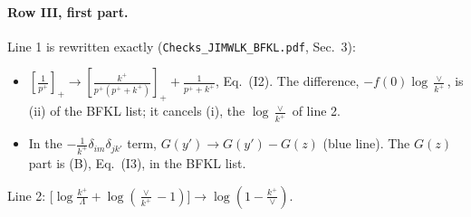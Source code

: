 \documentclass[10pt]{article}
\numberwithin{equation}{section}
\newcommand{\new}[1]{{\color{blue}#1}}
\begin{document}
\paragraph{Row III, first part.}
Line 1 is rewritten exactly (\texttt{Checks\_JIMWLK\_BFKL.pdf}, Sec.~3):
\begin{itemize}
\item $\left[\frac{1}{p^+}\right]_+\to\left[\frac{k^+}{p^+(p^++k^+)}\right]_++\frac{1}{p^++k^+}$, Eq.~(I2). The difference, $-f(0)\log\frac{\vee}{k^+}$, is (ii) of the BFKL list; it cancels (i), the $\log\frac{\vee}{k^+}$ of line 2.
\item In the $-\frac{1}{k^+}\delta_{im}\delta_{jk'}$ term, $G(y')\to G(y')-G(z)$ (\new{blue} line). The $G(z)$ part is (B), Eq.~(I3), in the BFKL list.
\end{itemize}
Line 2: $\big[\log\frac{k^+}{\Lambda}+\log(\frac{\vee}{k^+}-1)\big]\to\log(1-\frac{k^+}{\vee})$.
\end{document}
